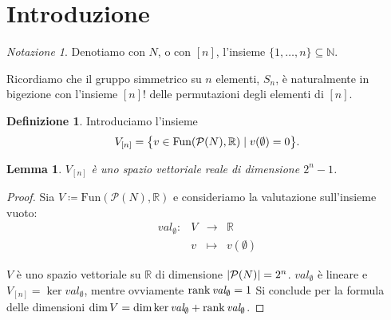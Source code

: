 \documentclass[a4paper,11pt]{article}
\theoremstyle{definition}				%
\newtheorem{definizione}{Definizione}%
\theoremstyle{remark}
\newtheorem*{notazione}{Notazione}
\theoremstyle{plain}
\newtheorem{lemma}{Lemma}%
\newcommand{\R}{\mathbb{R}}										%
\begin{document}
	\begin{abstract}
		In questo documento daremo la dimostrazione del Teorema di Shapley vista durante la lezione del 23/05/2023.
		
		Per dimostrare il teorema serviranno diversi risultati preliminari, non tutti visti a lezione.
		
		Documento scritto e formattato in \LaTeX{} da Andrea Marino. 

		Ogni segnalazione di errori è più che bene accetta. Potete scrivermi per e-mail all'indirizzo 
		\texttt{a.marino47@studenti.unipi.it}
	\end{abstract}
	
	\section*{Introduzione}
	\begin{notazione}
		Denotiamo con $N$, o con $[n]$, l'insieme $\{1,\dots,n\}\subseteq\mathbb{N}$.
		
		Ricordiamo che il gruppo simmetrico su $n$ elementi, $S_n$, è naturalmente in bigezione con l'insieme $[n]!$ delle permutazioni degli elementi di $[n]$.
	\end{notazione}
	
	\begin{definizione}
		Introduciamo l'insieme 
		\[
			V_{[n]}=\qty\big{v\in\mathrm{Fun}\qty(\mathcal{P}(N),\R)\mid v(\emptyset)=0}.
		\]
	\end{definizione}
	
	\begin{lemma}\label{lemma:vectorspace}
		$V_{[n]}$ è uno spazio vettoriale reale di dimensione $2^n-1$.
	\end{lemma}
	\begin{proof}
		Sia $V\coloneqq\mathrm{Fun}\left(\mathcal{P}(N),\R\right)$ e consideriamo la valutazione sull'insieme vuoto: 
		\[
			\begin{array}{rccl}
				\mathit{val}_{\emptyset}\colon	& V	& \longrightarrow & \R\\
				 & v & \longmapsto & v\left(\emptyset\right)
			\end{array}	
		\]
		
		$V$ è uno spazio vettoriale su $\R$ di dimensione $\qty|\mathcal{P}(N)|=2^n$. $\mathit{val}_{\emptyset}$ è lineare e $V_{[n]}=\ker\textit{val}_{\emptyset}$, mentre ovviamente $\rank \textit{val}_{\emptyset}=1$ Si conclude per la formula delle dimensioni $\dim V = \dim\ker\textit{val}_{\emptyset}+\rank\textit{val}_{\emptyset}$.
	\end{proof}
	
\end{document}

